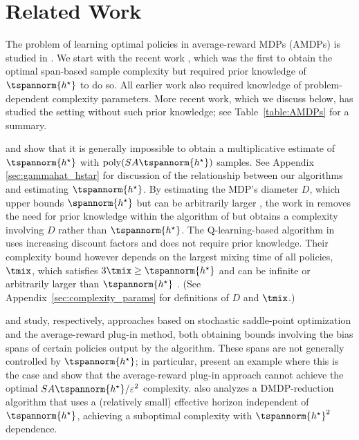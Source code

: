 \section{Related Work}
The problem of learning optimal policies in average-reward MDPs (AMDPs) is studied in \citet{jin_efficiently_2020, jin_towards_2021, li_stochastic_2024, wang_near_2022, zhang_sharper_2023, wang_optimal_2023}. We start with the recent work \cite{zurek_span-based_2025}, which was the first to obtain the optimal span-based sample complexity but required prior knowledge of $\tspannorm{h^\star}$ to do so. All earlier work also required knowledge of problem-dependent complexity parameters. More recent work, which we discuss below, has studied the setting without such prior knowledge; see Table~\ref{table:AMDPs} for a summary.

\cite{tuynman_finding_2024} and \cite{zurek_span-based_2025} show that it is generally impossible to obtain a multiplicative estimate of $\tspannorm{h^\star}$ with $\text{poly}(SA\tspannorm{h^\star})$ samples. See Appendix \ref{sec:gammahat_hstar} for discussion of the relationship between our algorithms and estimating $\tspannorm{h^\star}$. 
By estimating the MDP's diameter $D$, which upper bounds $\spannorm{h^\star} $ but can be arbitrarily larger \citep{bartlett_regal_2012, lattimore_bandit_2020}, the work in \cite{tuynman_finding_2024} removes the need for prior knowledge within the algorithm of \cite{zurek_span-based_2025} but obtains a complexity involving $D$ rather than $\tspannorm{h^\star}$. The Q-learning-based algorithm in \cite{jin_feasible_2024} uses increasing discount factors and does not require prior knowledge. Their complexity bound however depends on the largest mixing time of all policies, $\tmix$, which  satisfies $3\tmix \geq \tspannorm{h^\star}$ and can be infinite or arbitrarily larger than $\tspannorm{h^\star}$ \citep{wang_near_2022,zurek_plug-approach_2024}.
(See Appendix~\ref{sec:complexity_params} for definitions of $D$ and $\tmix$.) 

\cite{neu_dealing_2024} and \cite{zurek_plug-approach_2024} study, respectively, approaches based on stochastic saddle-point optimization and the average-reward plug-in method, both obtaining bounds involving the bias spans of certain policies output by the algorithm. These spans are not generally controlled by $\tspannorm{h^\star}$; in particular, \citet[Theorem 14]{zurek_plug-approach_2024} present an example where this is the case and show that the average-reward plug-in approach cannot achieve the optimal $SA \tspannorm{h^\star}/\varepsilon^2$ complexity. \cite{zurek_plug-approach_2024} also analyzes a DMDP-reduction algorithm that uses a (relatively small) effective horizon independent of $\tspannorm{h^\star}$, achieving a suboptimal complexity with $\tspannorm{h^\star}^2$ dependence.

